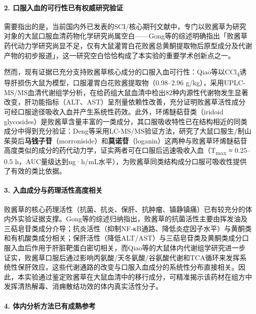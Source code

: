 \documentclass[12pt,a4paper,UTF8,scheme=chinese]{ctexart}
\newcommand{\compoundname}[1]{\textbf{#1}}
\begin{document}
\paragraph{2. 口服入血的可行性已有权威研究验证}

需要指出的是，当前国内外已发表的SCI/核心期刊文献中，专门以败酱草为研究对象的大鼠口服血清药物化学研究尚属空白——Gong等\cite{Gong2021}的综述明确指出「败酱草药代动力学研究尚显不足，仅有大鼠灌胃白花败酱总黄酮提取物后原型成分及代谢产物的初步报道」，这一研究空白恰恰构成了本实验的重要学术创新点之一。

然而，现有证据已充分支持败酱草核心成分的口服入血可行性：Qiao等\cite{Qiao2022}以CCl\textsubscript{4}诱导肝损伤大鼠为模型，口服灌胃白花败酱提取物（0.98--2.96 g/kg），采用UPLC-MS/MS血清代谢组学分析，在给药组大鼠血清中检出82种内源性代谢物发生显著改变，肝功能指标（ALT、AST）呈剂量依赖性改善，充分证明败酱草活性成分可经口服途径吸收入血并产生系统性药效。此外，环烯醚萜苷类（iridoid glycosides）是败酱草含量丰富的一类成分，其口服吸收特性已在结构相近的同类成分中得到充分验证：Deng等\cite{Deng2014}采用LC-MS/MS验证方法，研究了大鼠口服生/制山茱萸后\compoundname{马钱子苷}（morroniside）和\compoundname{莫诺苷}（loganin）这两种与败酱草环烯醚萜苷高度类似的成分的药代动力学，证实两者可在口服后迅速吸收入血（T\textsubscript{max} ≈ 0.25--0.5 h，AUC量级达到ng·h/mL水平），为败酱草同类结构成分口服可吸收性提供了有效的类比依据。

\paragraph{3. 入血成分与药理活性高度相关}

败酱草的核心药理活性（抗菌、抗炎、保肝、抗肿瘤、镇静镇痛）已有较充分的体内外实验证据支撑。Gong等\cite{Gong2021}的综述归纳指出，败酱草的抗菌活性主要由挥发油及三萜皂苷类成分介导；抗炎活性（抑制NF-κB通路、降低炎症因子水平）与黄酮类和有机酸类成分相关；保肝活性（降低ALT/AST）与三萜皂苷类及黄酮类成分口服入血后作用于肝脏靶蛋白密切相关，而Qiao等\cite{Qiao2022}的大鼠体内代谢组学研究进一步证实，败酱草口服后通过影响丙氨酸/天冬氨酸/谷氨酸代谢和TCA循环来发挥系统性保肝效应，这些代谢通路的改变与口服入血成分的系统性分布直接相关。因此，本实验通过鉴定败酱草在大鼠血清中的移行成分，可精准揭示该药材在组方中发挥清热解毒、消痈散结功效的体内真实活性分子。

\paragraph{4. 体内分析方法已有成熟参考}
\end{document}

